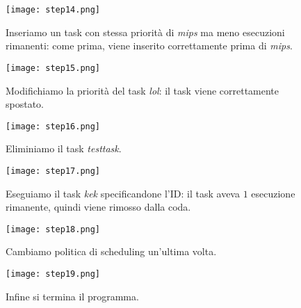        	\begin{figure}[h!]
       		\begin{center}
       			\texttt{[image: step14.png]}
       		\end{center}
       		\caption{Inseriamo un task con stessa priorità di \textit{mips} ma meno esecuzioni rimanenti: come prima, viene inserito correttamente prima di \textit{mips}.}
       		\label{fig:step14}
       	\end{figure}
       	
       	\begin{figure}[h!]
       		\begin{center}
       			\texttt{[image: step15.png]}
       		\end{center}
       		\caption{Modifichiamo la priorità del task \textit{lol}: il task viene correttamente spostato.}
       		\label{fig:step15}
       	\end{figure}
       	
       	\begin{figure}[h!]
       		\begin{center}
       			\texttt{[image: step16.png]}
       		\end{center}
       		\caption{Eliminiamo il task \textit{testtask}.}
       		\label{fig:step16}
       	\end{figure}
       	
       	\begin{figure}[h!]
       		\begin{center}
       			\texttt{[image: step17.png]}
       		\end{center}
       		\caption{Eseguiamo il task \textit{kek} specificandone l'ID: il task aveva $1$ esecuzione rimanente, quindi viene rimosso dalla coda.}
       		\label{fig:step17}
       	\end{figure}
       	
       	\begin{figure}[h!]
       		\begin{center}
       			\texttt{[image: step18.png]}
       		\end{center}
       		\caption{Cambiamo politica di scheduling un'ultima volta.}
       		\label{fig:step18}
       	\end{figure}
       	
       	\begin{figure}[h!]
       		\begin{center}
       			\texttt{[image: step19.png]}
       		\end{center}
       		\caption{Infine si termina il programma.}
       		\label{fig:step19}
       	\end{figure}
       	
